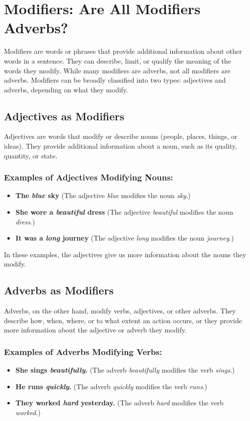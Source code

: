 \documentclass{book}
\begin{document}
\chapter{Modifiers: Are All Modifiers Adverbs?}

Modifiers are words or phrases that provide additional information about other words in a sentence. They can describe, limit, or qualify the meaning of the words they modify. While many modifiers are adverbs, not all modifiers are adverbs. Modifiers can be broadly classified into two types: adjectives and adverbs, depending on what they modify.

\section{Adjectives as Modifiers}
Adjectives are words that modify or describe nouns (people, places, things, or ideas). They provide additional information about a noun, such as its quality, quantity, or state.

\subsection{Examples of Adjectives Modifying Nouns:}
\begin{itemize}
	\item \textbf{The \textit{blue} sky} (The adjective \textit{blue} modifies the noun \textit{sky}.)
	\item \textbf{She wore a \textit{beautiful} dress} (The adjective \textit{beautiful} modifies the noun \textit{dress}.)
	\item \textbf{It was a \textit{long} journey} (The adjective \textit{long} modifies the noun \textit{journey}.)
\end{itemize}

In these examples, the adjectives give us more information about the nouns they modify.

\section{Adverbs as Modifiers}
Adverbs, on the other hand, modify verbs, adjectives, or other adverbs. They describe how, when, where, or to what extent an action occurs, or they provide more information about the adjective or adverb they modify.

\subsection{Examples of Adverbs Modifying Verbs:}
\begin{itemize}
	\item \textbf{She sings \textit{beautifully}.} (The adverb \textit{beautifully} modifies the verb \textit{sings}.)
	\item \textbf{He runs \textit{quickly}.} (The adverb \textit{quickly} modifies the verb \textit{runs}.)
	\item \textbf{They worked \textit{hard} yesterday.} (The adverb \textit{hard} modifies the verb \textit{worked}.)
\end{itemize}
\end{document}
